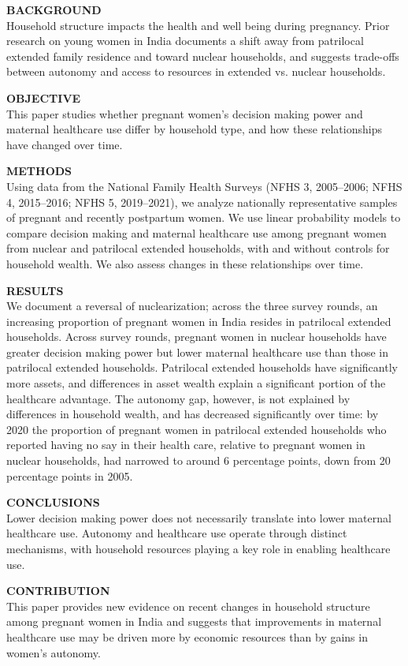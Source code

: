 \documentclass[10pt,twoside,reqno]{article}
\begin{document}
\noindent\textbf{BACKGROUND}\\
Household structure impacts the health and well being during pregnancy. Prior research on young women in India documents a shift away from patrilocal extended family residence and toward nuclear households, and suggests trade-offs between autonomy and access to resources in extended vs. nuclear households.
\par
\noindent\textbf{OBJECTIVE}\\
This paper studies whether pregnant women's decision making power and maternal healthcare use differ by household type, and how these relationships have changed over time.
\par
\noindent\textbf{METHODS}\\
Using data from the National Family Health Surveys (NFHS 3, 2005--2006; NFHS 4, 2015--2016; NFHS 5, 2019--2021), we analyze nationally representative samples of pregnant and recently postpartum women. We use linear probability models to compare decision making and maternal healthcare use among pregnant women from nuclear and patrilocal extended households, with and without controls for household wealth. We also assess changes in these relationships over time.
\par
\noindent\textbf{RESULTS}\\
We document a reversal of nuclearization; across the three survey rounds, an increasing proportion of pregnant women in India resides in patrilocal extended households. Across survey rounds, pregnant women in nuclear households have greater decision making power but lower maternal healthcare use than those in patrilocal extended households. Patrilocal extended households have significantly more assets, and differences in asset wealth explain a significant portion of the healthcare advantage. The autonomy gap, however, is not explained by differences in household wealth, and has decreased significantly over time: by 2020 the proportion of pregnant women in patrilocal extended households who reported having no say in their health care, relative to pregnant women in nuclear households, had narrowed to around 6 percentage points, down from 20 percentage points in 2005.
\par
\noindent\textbf{CONCLUSIONS}\\
Lower decision making power does not necessarily translate into lower maternal healthcare use. Autonomy and healthcare use operate through distinct mechanisms, with household resources playing a key role in enabling healthcare use.
\par
\noindent\textbf{CONTRIBUTION}\\
This paper provides new evidence on recent changes in household structure among pregnant women in India and suggests that improvements in maternal healthcare use may be driven more by economic resources than by gains in women's autonomy.
 
\end{document}
